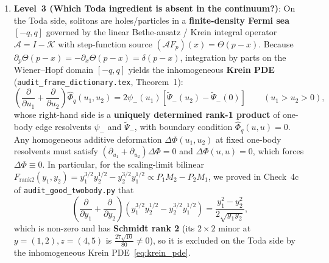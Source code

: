 \documentclass[11pt,a4paper]{article}
\begin{document}
\begin{enumerate}
\begin{itemize}
\end{itemize}
\item \textbf{Level~3 (Which Toda ingredient is absent in the continuum?)}:
On the Toda side, solitons are holes/particles in a \textbf{finite-density Fermi sea} $[-q,q]$ governed by the linear Bethe-ansatz / Krein integral operator $\mathcal{A} = I - \mathcal{K}$ with step-function source $(\mathcal{A}F_p)(x) = \Theta(p-x)$. Because $\partial_p\Theta(p-x) = -\partial_x\Theta(p-x) = \delta(p-x)$, integration by parts on the Wiener--Hopf domain $[-q,q]$ yields the inhomogeneous \textbf{Krein PDE} (\texttt{audit\_frame\_dictionary.tex}, Theorem~1):
\begin{equation}
\left(\frac{\partial}{\partial u_1} + \frac{\partial}{\partial u_2}\right)\widehat{\Phi}_q(u_1,u_2) = 2\psi_-(u_1)\!\left[\widetilde{\Psi}_-(u_2) - \widetilde{\Psi}_-(0)\right] \qquad (u_1 > u_2 > 0),
\label{eq:krein_pde}
\end{equation}
whose right-hand side is a \textbf{uniquely determined rank-1 product} of one-body edge resolvents $\psi_-$ and $\widetilde{\Psi}_-$, with boundary condition $\widehat{\Phi}_q(u,u)=0$. Any homogeneous additive deformation $\Delta\Phi(u_1,u_2)$ at fixed one-body resolvents must satisfy $(\partial_{u_1}+\partial_{u_2})\Delta\Phi = 0$ and $\Delta\Phi(u,u)=0$, which forces $\Delta\Phi \equiv 0$. In particular, for the scaling-limit bilinear $F_{\mathrm{rank2}}(y_1,y_2) = y_1^{3/2}y_2^{1/2} - y_2^{3/2}y_1^{1/2} \propto P_1 M_2 - P_2 M_1$, we proved in Check~4c of \texttt{audit\_good\_twobody.py} that
\begin{equation}
\left(\frac{\partial}{\partial y_1} + \frac{\partial}{\partial y_2}\right)\!\left(y_1^{3/2}y_2^{1/2} - y_2^{3/2}y_1^{1/2}\right) = \frac{y_1^2 - y_2^2}{2\sqrt{y_1 y_2}},
\end{equation}
which is non-zero and has \textbf{Schmidt rank 2} (its $2\times 2$ minor at $y=(1,2), z=(4,5)$ is $\frac{27\sqrt{10}}{80} \neq 0$), so it is excluded on the Toda side by the inhomogeneous Krein PDE~\eqref{eq:krein_pde}.
\end{enumerate}
\end{document}
